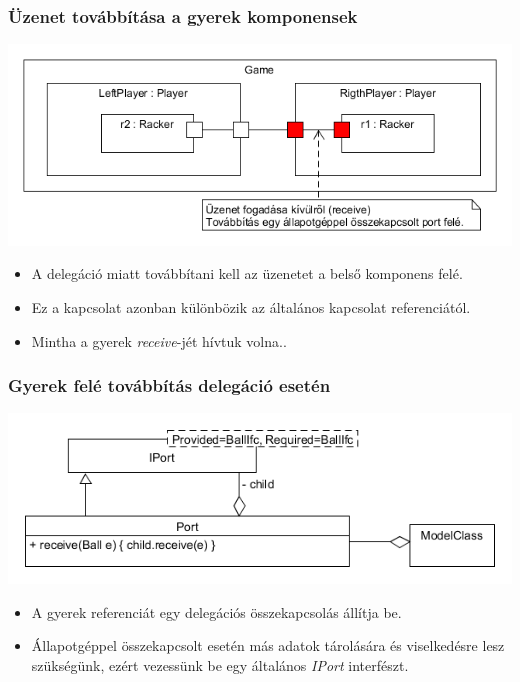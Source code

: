 \documentclass[11pt]{beamer}
\begin{document}
\begin{frame}
	\frametitle{Üzenet továbbítása a gyerek komponensek}
	\begin{center}
	\includegraphics[scale=0.5]{vedes_demo_recived.png}
	\end{center}
	\begin{itemize}
	\item A delegáció miatt továbbítani kell az üzenetet a belső komponens felé.
	\item Ez a kapcsolat azonban különbözik az általános kapcsolat referenciától.
	\item Mintha a gyerek \textit{receive}-jét hívtuk volna..
	\end{itemize}
\end{frame}

\begin{frame}
	\frametitle{Gyerek felé továbbítás delegáció esetén}
	\begin{center}
	\includegraphics[scale=0.5]{vedes_demo_notbehav_port.png}
	\end{center}
	\begin{itemize}
	\item A gyerek referenciát egy delegációs összekapcsolás állítja be.
	\item Állapotgéppel összekapcsolt esetén más adatok tárolására és viselkedésre lesz szükségünk, ezért vezessünk be egy általános \textit{IPort} interfészt.
	\end{itemize}
\end{frame}
\end{document}

